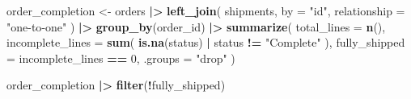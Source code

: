 \documentclass[
]{article}
\newenvironment{Shaded}{\begin{snugshade}}{\end{snugshade}}
\newcommand{\AttributeTok}[1]{\textcolor[rgb]{0.13,0.29,0.53}{#1}}
\newcommand{\DecValTok}[1]{\textcolor[rgb]{0.00,0.00,0.81}{#1}}
\newcommand{\FunctionTok}[1]{\textcolor[rgb]{0.13,0.29,0.53}{\textbf{#1}}}
\newcommand{\NormalTok}[1]{#1}
\newcommand{\OtherTok}[1]{\textcolor[rgb]{0.56,0.35,0.01}{#1}}
\newcommand{\SpecialCharTok}[1]{\textcolor[rgb]{0.81,0.36,0.00}{\textbf{#1}}}
\newcommand{\StringTok}[1]{\textcolor[rgb]{0.31,0.60,0.02}{#1}}
\begin{document}
\begin{Shaded}
\begin{Highlighting}[]
\NormalTok{order\_completion }\OtherTok{\textless{}{-}}\NormalTok{ orders }\SpecialCharTok{|\textgreater{}}
  \FunctionTok{left\_join}\NormalTok{(}
\NormalTok{    shipments,}
    \AttributeTok{by =} \StringTok{"id"}\NormalTok{,}
    \AttributeTok{relationship =} \StringTok{"one{-}to{-}one"}
\NormalTok{  ) }\SpecialCharTok{|\textgreater{}}
  \FunctionTok{group\_by}\NormalTok{(order\_id) }\SpecialCharTok{|\textgreater{}}
  \FunctionTok{summarize}\NormalTok{(}
    \AttributeTok{total\_lines =} \FunctionTok{n}\NormalTok{(),}
    \AttributeTok{incomplete\_lines =} \FunctionTok{sum}\NormalTok{(}
      \FunctionTok{is.na}\NormalTok{(status) }\SpecialCharTok{|}\NormalTok{ status }\SpecialCharTok{!=} \StringTok{"Complete"}
\NormalTok{    ),}
    \AttributeTok{fully\_shipped =}\NormalTok{ incomplete\_lines }\SpecialCharTok{==} \DecValTok{0}\NormalTok{,}
    \AttributeTok{.groups =} \StringTok{"drop"}
\NormalTok{  )}

\NormalTok{order\_completion }\SpecialCharTok{|\textgreater{}}
  \FunctionTok{filter}\NormalTok{(}\SpecialCharTok{!}\NormalTok{fully\_shipped)}
\end{Highlighting}
\end{Shaded}
\end{document}
